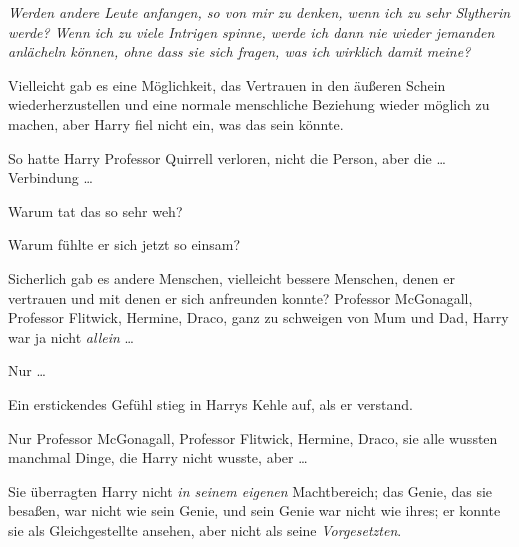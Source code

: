 \emph{Werden andere Leute anfangen, so von mir zu denken, wenn ich zu sehr Slytherin werde? Wenn ich zu viele Intrigen spinne, werde ich dann nie wieder jemanden anlächeln können, ohne dass sie sich fragen, was ich wirklich damit meine?}

Vielleicht gab es eine Möglichkeit, das Vertrauen in den äußeren Schein wiederherzustellen und eine normale menschliche Beziehung wieder möglich zu machen, aber Harry fiel nicht ein, was das sein könnte.

So hatte Harry Professor Quirrell verloren, nicht die Person, aber die … Verbindung …

Warum tat das so sehr weh?

Warum fühlte er sich jetzt so einsam?

Sicherlich gab es andere Menschen, vielleicht bessere Menschen, denen er vertrauen und mit denen er sich anfreunden konnte? Professor McGonagall, Professor Flitwick, Hermine, Draco, ganz zu schweigen von Mum und Dad, Harry war ja nicht \emph{allein} …

Nur …

Ein erstickendes Gefühl stieg in Harrys Kehle auf, als er verstand.

Nur Professor McGonagall, Professor Flitwick, Hermine, Draco, sie alle wussten manchmal Dinge, die Harry nicht wusste, aber …

Sie überragten Harry nicht \emph{in seinem eigenen} Machtbereich; das Genie, das sie besaßen, war nicht wie sein Genie, und sein Genie war nicht wie ihres; er konnte sie als Gleichgestellte ansehen, aber nicht als seine \emph{Vorgesetzten}.

